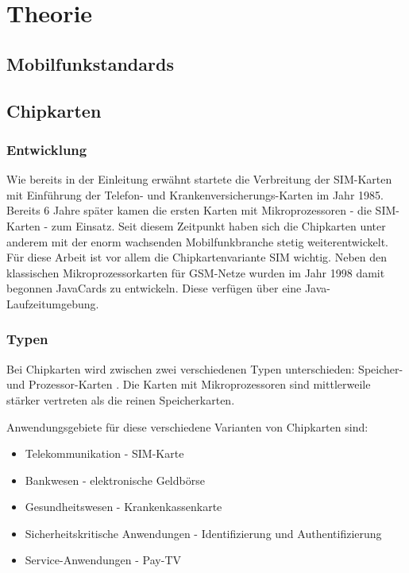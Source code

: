 \clearpage

\section{Theorie}
\label{theorie}

\subsection{Mobilfunkstandards}

\subsection{Chipkarten}
\subsubsection{Entwicklung}
Wie bereits in der Einleitung erwähnt startete die Verbreitung der SIM-Karten
mit Einführung der Telefon- und Krankenversicherungs-Karten im Jahr 1985.
Bereits 6 Jahre später kamen die ersten Karten mit Mikroprozessoren - die \ac{SIM}-Karten
- zum Einsatz. Seit diesem Zeitpunkt haben sich die Chipkarten unter anderem
mit der enorm wachsenden Mobilfunkbranche stetig weiterentwickelt. Für diese
Arbeit ist vor allem die Chipkartenvariante \ac{SIM} wichtig.
Neben den klassischen Mikroprozessorkarten für \ac{GSM}-Netze wurden im Jahr
1998 damit begonnen JavaCards zu entwickeln. Diese verfügen über eine
Java-Laufzeitumgebung.

\subsubsection{Typen}
Bei Chipkarten wird zwischen zwei verschiedenen Typen unterschieden:
Speicher- und Prozessor-Karten \cite{chipkarten02}. Die Karten mit Mikroprozessoren
sind mittlerweile stärker vertreten als die reinen Speicherkarten.

Anwendungsgebiete für diese verschiedene Varianten von Chipkarten sind:
\begin{itemize}
\item Telekommunikation - \ac{SIM}-Karte
\item Bankwesen - elektronische Geldbörse
\item Gesundheitswesen - Krankenkassenkarte
\item Sicherheitskritische Anwendungen - Identifizierung und Authentifizierung
\item Service-Anwendungen - Pay-TV
\end{itemize}

